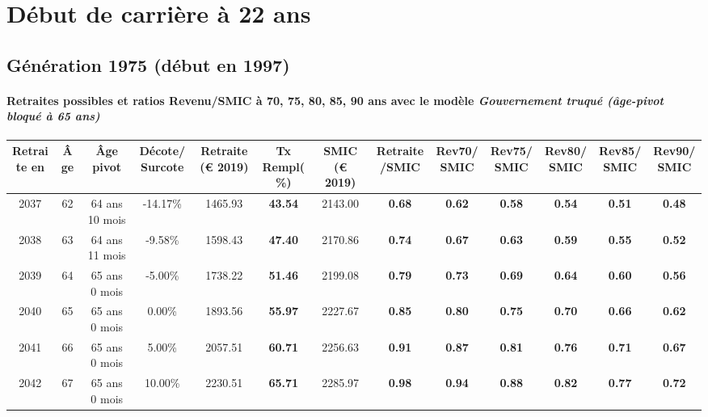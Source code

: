 \section{Début de carrière à 22 ans} 

\subsection{Génération 1975 (début en 1997)} 

\paragraph{Retraites possibles et ratios Revenu/SMIC à 70, 75, 80, 85, 90 ans avec le modèle \emph{Gouvernement truqué (âge-pivot bloqué à 65 ans)}}  
 
{ \scriptsize \begin{center} 
\begin{tabular}[htb]{|c|c||c|c||c|c||c||c|c|c|c|c|c|} 
\hline 
 Retraite en &  Âge &  Âge pivot &  Décote/Surcote &  Retraite (\euro{} 2019) &  Tx Rempl(\%) &  SMIC (\euro{} 2019) &  Retraite/SMIC &  Rev70/SMIC &  Rev75/SMIC &  Rev80/SMIC &  Rev85/SMIC &  Rev90/SMIC \\ 
\hline \hline 
 2037 &  62 &  64 ans 10 mois &  -14.17\% &  1465.93 &  {\bf 43.54} &  2143.00 &  {\bf {\color{red} 0.68}} &  {\bf {\color{red} 0.62}} &  {\bf {\color{red} 0.58}} &  {\bf {\color{red} 0.54}} &  {\bf {\color{red} 0.51}} &  {\bf {\color{red} 0.48}} \\ 
\hline 
 2038 &  63 &  64 ans 11 mois &  -9.58\% &  1598.43 &  {\bf 47.40} &  2170.86 &  {\bf {\color{red} 0.74}} &  {\bf {\color{red} 0.67}} &  {\bf {\color{red} 0.63}} &  {\bf {\color{red} 0.59}} &  {\bf {\color{red} 0.55}} &  {\bf {\color{red} 0.52}} \\ 
\hline 
 2039 &  64 &  65 ans 0 mois &  -5.00\% &  1738.22 &  {\bf 51.46} &  2199.08 &  {\bf {\color{red} 0.79}} &  {\bf {\color{red} 0.73}} &  {\bf {\color{red} 0.69}} &  {\bf {\color{red} 0.64}} &  {\bf {\color{red} 0.60}} &  {\bf {\color{red} 0.56}} \\ 
\hline 
 2040 &  65 &  65 ans 0 mois &  0.00\% &  1893.56 &  {\bf 55.97} &  2227.67 &  {\bf {\color{red} 0.85}} &  {\bf {\color{red} 0.80}} &  {\bf {\color{red} 0.75}} &  {\bf {\color{red} 0.70}} &  {\bf {\color{red} 0.66}} &  {\bf {\color{red} 0.62}} \\ 
\hline 
 2041 &  66 &  65 ans 0 mois &  5.00\% &  2057.51 &  {\bf 60.71} &  2256.63 &  {\bf {\color{red} 0.91}} &  {\bf {\color{red} 0.87}} &  {\bf {\color{red} 0.81}} &  {\bf {\color{red} 0.76}} &  {\bf {\color{red} 0.71}} &  {\bf {\color{red} 0.67}} \\ 
\hline 
 2042 &  67 &  65 ans 0 mois &  10.00\% &  2230.51 &  {\bf 65.71} &  2285.97 &  {\bf {\color{red} 0.98}} &  {\bf {\color{red} 0.94}} &  {\bf {\color{red} 0.88}} &  {\bf {\color{red} 0.82}} &  {\bf {\color{red} 0.77}} &  {\bf {\color{red} 0.72}} \\ 
\hline 
\hline 
\end{tabular} 
\end{center} } 
